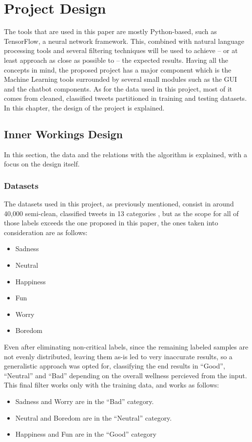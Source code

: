 \chapter{Project Design}
The tools that are used in this paper are mostly Python-based, such as TensorFlow, a neural network framework. This, combined with natural language processing tools and several filtering techniques will be used to achieve -- or at least approach as close as possible to -- the expected results.
Having all the concepts in mind, the proposed project has a major component which is the Machine Learning tools surrounded by several small modules such as the GUI and the chatbot components.
As for the data used in this project, most of it comes from cleaned, classified tweets partitioned in training and testing datasets.
In this chapter, the design of the project is explained.

\section{Inner Workings Design}
In this section, the data and the relations with the algorithm is explained, with a focus on the design itself.
\subsection{Datasets}
The datasets used in this project, as previously mentioned, consist in around 40,000 semi-clean, classified tweets in 13 categories \citep{rf20}, but as the scope for all of those labels exceeds the one proposed in this paper, the ones taken into consideration are as follows:
\begin{itemize}
	\item Sadness
	\item Neutral
	\item Happiness
	\item Fun
	\item Worry
	\item Boredom
\end{itemize}
Even after eliminating non-critical labels, since the remaining  labeled samples are not evenly distributed, leaving them as-is led to very inaccurate results, so a generalistic approach was opted for, classifying the end results in ``Good'', ``Neutral'' and ``Bad'' depending on the overall wellness percieved from the input.
This final filter works only with the training data, and works as follows:
\begin{itemize}
	\item Sadness and Worry are in the ``Bad'' category.
	\item Neutral and Boredom are in the ``Neutral'' category.
	\item Happiness and Fun are in the ``Good'' category
\end{itemize}

